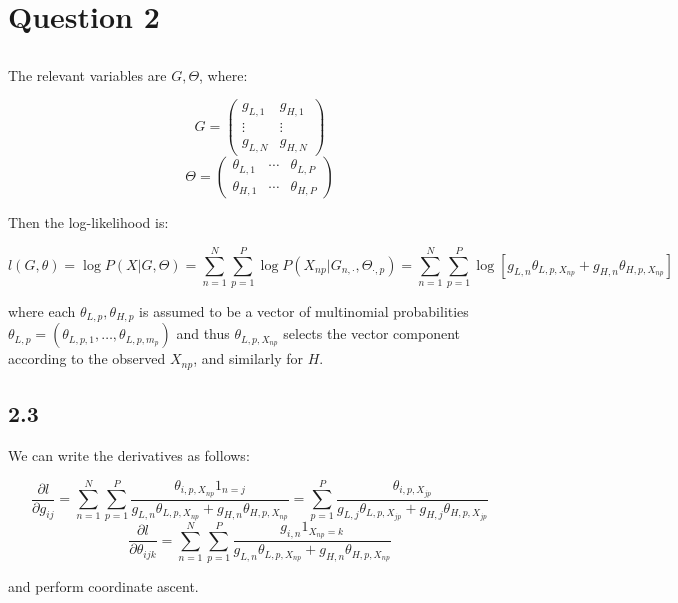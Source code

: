 \documentclass[psamsfonts]{amsart}
\theoremstyle{definition}
\theoremstyle{remark}
\numberwithin{equation}{section}
\begin{document}
\section{Question 2}

\subsection{} The relevant variables are $G, \Theta$, where:

$$G = \begin{pmatrix}g_{L,1} & g_{H,1} \\ \vdots & \vdots \\ g_{L,N} & g_{H,N}\end{pmatrix}$$
$$\Theta = \begin{pmatrix} \theta_{L,1} & \cdots & \theta_{L,P}\\\theta_{H,1} & \cdots & \theta_{H,P}\end{pmatrix}$$

Then the log-likelihood is:

$$l(G,\theta) = \log P(X|G,\Theta) = \sum_{n=1}^N \sum_{p=1}^P \log P(X_{np}|G_{n,\cdot}, \Theta_{\cdot, p}) = \sum_{n=1}^N \sum_{p=1}^P \log\left[ g_{L,n}\theta_{L,p,X_{np}} + g_{H,n}\theta_{H,p,X_{np}}\right]$$

where each $\theta_{L,p}, \theta_{H,p}$ is assumed to be a vector of multinomial probabilities $\theta_{L,p} = (\theta_{L,p,1}, \dots, \theta_{L,p,m_p})$ and thus $\theta_{L,p,X_{np}}$ selects the vector component according to the observed $X_{np}$, and similarly for $H$.

\subsection*{2.3} We can write the derivatives as follows:

$$\frac{\partial l}{\partial g_{ij}} = \sum_{n=1}^N \sum_{p=1}^P \frac{\theta_{i,p,X_{np}} 1_{n=j}}{g_{L,n}\theta_{L,p,X_{np}}+ g_{H,n}\theta_{H,p,X_{np}}} = \sum_{p=1}^P \frac{\theta_{i,p,X_{jp}}}{g_{L,j}\theta_{L,p,X_{jp}} + g_{H,j} \theta_{H,p,X_{jp}}}$$
$$\frac{\partial l}{\partial \theta_{ijk}} = \sum_{n=1}^N \sum_{p=1}^P \frac{g_{i,n} 1_{X_{np}=k}}{g_{L,n}\theta_{L,p,X_{np}} + g_{H,n}\theta_{H,p,X_{np}}}$$

and perform coordinate ascent.
\end{document}
